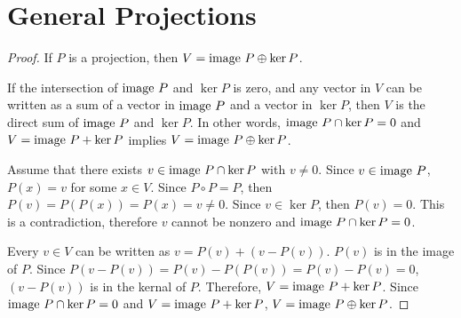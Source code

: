 \section{General Projections}
\begin{proof}If $P$ is a projection, then $V = \text{image } P \oplus \ker P$.\gap

    If the intersection of $\text{image } P$ and $\ker P$ is zero, and
    any vector in $V$ can be written as a sum of a vector 
    in $\text{image } P$ and a vector in $\ker P$, then
    $V$ is the direct sum of $\text{image } P$ and $\ker P$.
    In other words, $\text{image } P \cap \ker P = 0$ and 
    $V = \text{image } P + \ker P$ implies
    $V = \text{image } P \oplus \ker P$. \gap

    Assume that there exists $v \in \text{image } P \cap \ker P$ 
    with $v \neq 0$.
    Since $v \in \text{image } P$, 
    $P(x) = v$ for some $x \in V$.
    Since $P \circ P = P$, 
    then $P(v) = P(P(x)) = P(x) = v \neq 0$.
    Since $v \in \ker P$, then $P(v) = 0$.
    This is a contradiction, therefore $v$ cannot be nonzero and
    $\text{image } P \cap \ker P = 0$.\gap

    Every $v \in V$ can be written as $v = P(v) + (v - P(v))$.
    $P(v)$ is in the image of $P$.
    Since $P(v - P(v)) = P(v) - P(P(v)) = P(v) - P(v) = 0$,
    $(v - P(v))$ is in the kernal of $P$.
    Therefore, $V = \text{image } P + \ker P$.
    Since $\text{image } P \cap \ker P = 0$ and $V = \text{image } P + \ker P$,
    $V = \text{image } P \oplus \ker P$.
\end{proof}